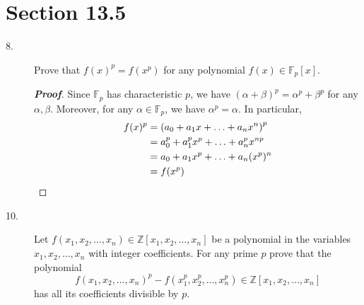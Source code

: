 \documentclass[12pt,leqno]{book}
\theoremstyle{definition}
\newcommand{\Z}{\mathbb{Z}}
\newcommand{\F}{\mathbb{F}}
\newenvironment{Proof}{\begin{proof}[\textnormal{\textbf{Proof}}]}{\end{proof}}
\begin{document}
\section*{Section 13.5}
  \begin{description}
   \item [8.] Prove that $f(x)^p=f(x^p)$ for any polynomial $f(x)\in \F_p[x]$.
    \begin{Proof}
     Since $\F_p$ has characteristic $p$, we have $(\alpha+\beta)^p=\alpha^p+\beta^p$ for any $\alpha,\beta$. Moreover, for any $\alpha\in \F_p$, we have $\alpha^p=\alpha$. In particular, \begin{align*}f(x)^p&=\left(a_0+a_1x+\hdots+a_nx^n\right)^p\\&=a_0^p+a_1^px^p+\hdots+a_n^px^{np}\\&=a_0+a_1x^p+\hdots+a_n(x^p)^n\\&=f(x^p)\qedhere\end{align*}
    \end{Proof}
   \item [10.] Let $f(x_1,x_2,\hdots,x_n)\in\Z[x_1,x_2,\hdots,x_n]$ be a polynomial in the variables $x_1,x_2,\hdots,x_n$ with integer coefficients. For any prime $p$ prove that the polynomial \[f(x_1,x_2,\hdots,x_n)^p-f(x_1^p,x_2^p,\hdots,x_n^p)\in\Z[x_1,x_2,\hdots,x_n]\] has all its coefficients divisible by $p$.
  \end{description}
\end{document}
